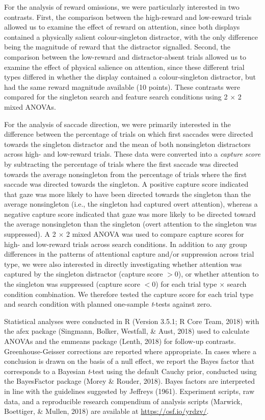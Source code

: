 \documentclass[man, a4paper, noextraspace, 11pt,floatsintext]{apa6}
\begin{document}
For the analysis of reward omissions, we were particularly interested in
two contrasts. First, the comparison between the high-reward and
low-reward trials allowed us to examine the effect of reward on
attention, since both displays contained a physically salient
colour-singleton distractor, with the only difference being the
magnitude of reward that the distractor signalled. Second, the
comparison between the low-reward and distractor-absent trials allowed
us to examine the effect of physical salience on attention, since these
different trial types differed in whether the display contained a
colour-singleton distractor, but had the same reward magnitude available
(10 points). These contrasts were compared for the singleton search and
feature search conditions using 2 \(\times\) 2 mixed ANOVAs.

For the analysis of saccade direction, we were primarily interested in
the difference between the percentage of trials on which first saccades
were directed towards the singleton distractor and the mean of both
nonsingleton distractors across high- and low-reward trials. These data
were converted into a \emph{capture score} by subtracting the percentage
of trials where the first saccade was directed towards the average
nonsingleton from the percentage of trials where the first saccade was
directed towards the singleton. A positive capture score indicated that
gaze was more likely to have been directed towards the singleton than
the average nonsingleton (i.e., the singleton had captured overt
attention), whereas a negative capture score indicated that gaze was
more likely to be directed toward the average nonsingleton than the
singleton (overt attention to the singleton was suppressed). A 2
\(\times\) 2 mixed ANOVA was used to compare capture scores for high-
and low-reward trials across search conditions. In addition to any group
differences in the patterns of attentional capture and/or suppression
across trial type, we were also interested in directly investigating
whether attention was captured by the singleton distractor (capture
score \(>0\)), or whether attention to the singleton was suppressed
(capture score \(<0\)) for each trial type \(\times\) search condition
combination. We therefore tested the capture score for each trial type
and search condition with planned one-sample \emph{t}-tests against
zero.

Statistical analyses were conducted in R (Version 3.5.1; R Core Team,
2018) with the afex package (Singmann, Bolker, Westfall, \& Aust, 2018)
used to calculate ANOVAs and the emmeans package (Lenth, 2018) for
follow-up contrasts. Greenhouse-Geisser corrections are reported where
appropriate. In cases where a conclusion is drawn on the basis of a null
effect, we report the Bayes factor that corresponds to a Bayesian
\emph{t}-test using the default Cauchy prior, conducted using the
BayesFactor package (Morey \& Rouder, 2018). Bayes factors are
interpreted in line with the guidelines suggested by Jeffreys (1961).
Experiment scripts, raw data, and a reproducible research compendium of
analysis scripts (Marwick, Boettiger, \& Mullen, 2018) are available at
\url{https://osf.io/yrdzv/}.
\end{document}
